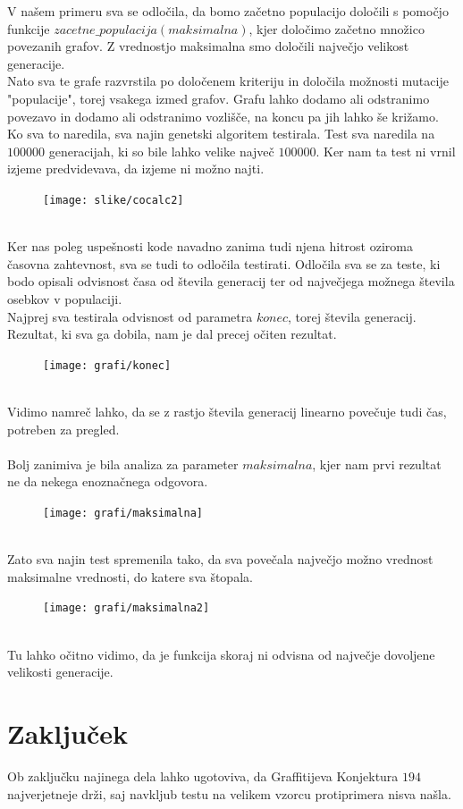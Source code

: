 \documentclass[12pt,a4paper]{amsart}
\theoremstyle{definition} %
\theoremstyle{plain} %
\begin{document}
V našem primeru sva se odločila, da bomo začetno populacijo določili s pomočjo funkcije $zacetne\_populacija(maksimalna)$,  kjer določimo začetno množico povezanih grafov. Z vrednostjo maksimalna smo določili največjo velikost generacije.\\
Nato sva te grafe razvrstila po določenem kriteriju in določila možnosti mutacije "populacije", torej vsakega izmed grafov. Grafu lahko dodamo ali odstranimo povezavo in dodamo ali odstranimo vozlišče, na koncu pa jih lahko še križamo.\\
Ko sva to naredila, sva najin genetski algoritem testirala.
Test sva naredila na $100000$ generacijah, ki so bile lahko velike največ $100000$. Ker nam ta test ni vrnil izjeme predvidevava, da izjeme ni možno najti.\\
\begin{figure}[h]
	\texttt{[image: slike/cocalc2]}
\end{figure}

\ \\
Ker nas poleg uspešnosti kode navadno zanima tudi njena hitrost oziroma časovna zahtevnost, sva se tudi to odločila testirati. Odločila sva se za teste, ki bodo opisali odvisnost časa od števila generacij ter od največjega možnega števila osebkov v populaciji.\\
Najprej sva testirala odvisnost od parametra $konec$, torej števila generacij. Rezultat, ki sva ga dobila, nam je dal precej očiten rezultat.
\begin{figure}[h]
	\texttt{[image: grafi/konec]}
\end{figure}
\ \\
Vidimo namreč lahko, da se z rastjo števila generacij linearno povečuje tudi čas, potreben za pregled.
\\
\ \\
Bolj zanimiva je bila analiza za parameter $maksimalna$, kjer nam prvi rezultat ne da nekega enoznačnega odgovora.
\begin{figure}[h!]
	\texttt{[image: grafi/maksimalna]}
\end{figure}
\ \\
Zato sva najin test spremenila tako, da sva povečala največjo možno vrednost maksimalne vrednosti, do katere sva štopala.
\begin{figure}[h]
	\texttt{[image: grafi/maksimalna2]}
\end{figure}
\ \\
Tu lahko očitno vidimo, da je funkcija skoraj ni odvisna od največje dovoljene velikosti generacije.
\section{Zaključek}
Ob zaključku najinega dela lahko ugotoviva, da Graffitijeva Konjektura $194$ najverjetneje drži, saj navkljub testu na velikem vzorcu protiprimera nisva našla.
\end{document}

